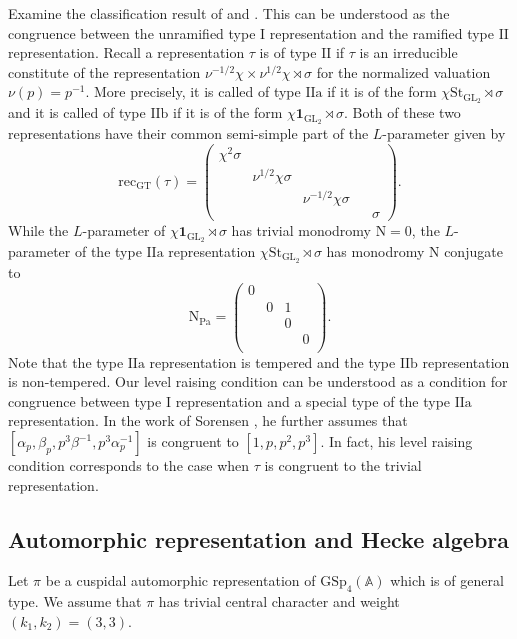 \documentclass[10pt]{amsart}
\numberwithin{equation}{section}
\theoremstyle{definition}
\def\GL{\mathrm{GL}}
\def\GSp{\mathrm{GSp}}
\def\Pa{\mathrm{Pa}}
\def\rma{\mathrm{a}}
\def\rmb{\mathrm{b}}
\def\rmN{\mathrm{N}}
\begin{document}
Examine the classification result of \cite{ST-classification} and \cite{Sch-Iwahori}. This can be understood as the congruence between the unramified type $\mathrm{I}$ representation and the ramified type $\mathrm{II}$ representation. Recall a representation $\tau$ is of type $\mathrm{II}$ if $\tau$ is an irreducible constitute of the representation $\nu^{-1/2}\chi\times\nu^{1/2}\chi\rtimes \sigma$ for the normalized valuation $\nu(p)=p^{-1}$. More precisely, it is called of type $\mathrm{IIa}$ if it is of the form $\chi\mathrm{St}_{\GL_{2}}\rtimes \sigma$ and it is called of type $\mathrm{II}\rmb$ if it is of the form $\chi\mathbf{1}_{\GL_{2}}\rtimes \sigma$. Both of these two representations have their common semi-simple part of the $L$-parameter given by
\begin{equation*}
\mathrm{rec}_{\mathrm{GT}}(\tau)= \begin{pmatrix}\chi^{2}\sigma&&&\\&\nu^{1/2}\chi\sigma&&&\\&&\nu^{-1/2}\chi\sigma&&\\&&&&\sigma\end{pmatrix}.
\end{equation*}
While the $L$-parameter of $\chi\mathbf{1}_{\GL_{2}}\rtimes \sigma$ has trivial monodromy $\mathrm{N}=0$,  the $L$-parameter of the type $\mathrm{II}\rma$ representation $\chi\mathrm{St}_{\GL_{2}}\rtimes \sigma$ has monodromy $\mathrm{N}$ conjugate to 
\begin{equation}\label{N1}
\rmN_{\Pa}=\begin{pmatrix}0&&&\\&0&1&\\&&0&\\&&&0\\ \end{pmatrix}. 
\end{equation}
Note that the type $\mathrm{IIa}$ representation is tempered and the type $\mathrm{IIb}$ representation is non-tempered. Our level raising condition can be understood as a condition for congruence between type $\mathrm{I}$ representation and  a special type of the type $\mathrm{II}\rma$ representation. In the work of Sorensen \cite{Sor-level-raising}, he further assumes that  $[\alpha_{p}, \beta_{p}, p^{3}\beta^{-1}, p^{3}\alpha^{-1}_{p}]$ is congruent to $[1, p, p^{2}, p^{3}]$. In fact, his level raising condition corresponds to the case when $\tau$ is congruent to the trivial representation. 

\subsection{Automorphic representation and Hecke algebra}
Let $\pi$ be a cuspidal automorphic representation of $\GSp_{4}(\mathbb{A})$ which is of general type. We assume that $\pi$ has trivial central character and  weight $(k_{1}, k_{2})=(3, 3)$. 
\end{document}
